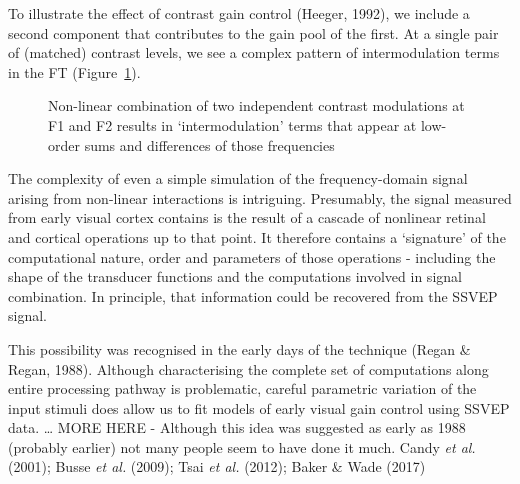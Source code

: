 \documentclass[
  letterpaper,
  DIV=11,
  numbers=noendperiod]{scrartcl}
\begin{document}
To illustrate the effect of contrast gain control (Heeger, 1992), we
include a second component that contributes to the gain pool of the
first. At a single pair of (matched) contrast levels, we see a complex
pattern of intermodulation terms in the FT
(Figure~\ref{fig-intermodulation}).

\begin{figure}


\caption{\label{fig-intermodulation}Non-linear combination of two
independent contrast modulations at F1 and F2 results in
`intermodulation' terms that appear at low-order sums and differences of
those frequencies}

\end{figure}%

The complexity of even a simple simulation of the frequency-domain
signal arising from non-linear interactions is intriguing. Presumably,
the signal measured from early visual cortex contains is the result of a
cascade of nonlinear retinal and cortical operations up to that point.
It therefore contains a `signature' of the computational nature, order
and parameters of those operations - including the shape of the
transducer functions and the computations involved in signal
combination. In principle, that information could be recovered from the
SSVEP signal.

This possibility was recognised in the early days of the technique
(Regan \& Regan, 1988). Although characterising the complete set of
computations along entire processing pathway is problematic, careful
parametric variation of the input stimuli does allow us to fit models of
early visual gain control using SSVEP data. \ldots{} MORE HERE -
Although this idea was suggested as early as 1988 (probably earlier) not
many people seem to have done it much. Candy \emph{et al.} (2001); Busse
\emph{et al.} (2009); Tsai \emph{et al.} (2012); Baker \& Wade (2017)
\end{document}
